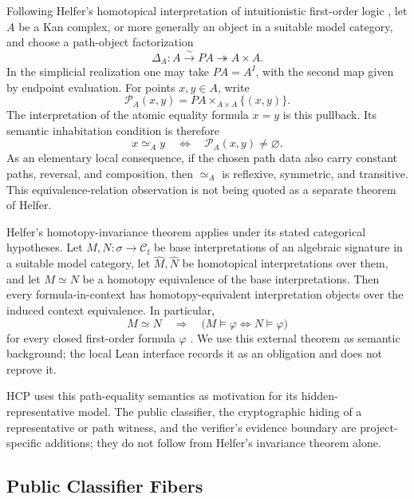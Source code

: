 Following Helfer's homotopical interpretation of intuitionistic first-order
logic \cite[Section~2 and Definitions~6.3 and~6.6]{helfer2019fol}, let \(A\)
be a Kan complex, or more generally an object in a suitable model category,
and choose a path-object factorization
\[
  \Delta_A:A\overset{\sim}{\longrightarrow}PA
  \twoheadrightarrow A\times A.
\]
In the simplicial realization one may take \(PA=A^I\), with the second map
given by endpoint evaluation. For points \(x,y\in A\), write
\[
  \mathcal P_A(x,y)
  = PA\times_{A\times A}\{(x,y)\}.
\]
The interpretation of the atomic equality formula \(x=y\) is this pullback.
Its semantic inhabitation condition is therefore
\[
  x\simeq_A y
  \quad\Longleftrightarrow\quad
  \mathcal P_A(x,y)\neq\varnothing .
\]
As an elementary local consequence, if the chosen path data also carry
constant paths, reversal, and composition, then \(\simeq_A\) is reflexive,
symmetric, and transitive. This equivalence-relation observation is not being
quoted as a separate theorem of Helfer.

Helfer's homotopy-invariance theorem applies under its stated categorical
hypotheses. Let \(M,N:\sigma\to\mathcal C_{\mathrm f}\) be base
interpretations of an algebraic signature in a suitable model category, let
\(\widehat M,\widehat N\) be homotopical interpretations over them, and let
\(M\simeq N\) be a homotopy equivalence of the base interpretations. Then every
formula-in-context has homotopy-equivalent interpretation objects over the
induced context equivalence. In particular,
\[
  M\simeq N
  \quad\Longrightarrow\quad
  \bigl(M\models\varphi \Longleftrightarrow N\models\varphi\bigr)
\]
for every closed first-order formula \(\varphi\)
\cite[Definition~7.1 and Theorem~12.3]{helfer2019fol}. We use this external
theorem as semantic background; the local Lean interface records it as an
obligation and does not reprove it.

HCP uses this path-equality semantics as motivation for its hidden-
representative model. The public classifier, the cryptographic hiding of a
representative or path witness, and the verifier's evidence boundary are
project-specific additions; they do not follow from Helfer's invariance
theorem alone.

\subsection{Public Classifier Fibers}

